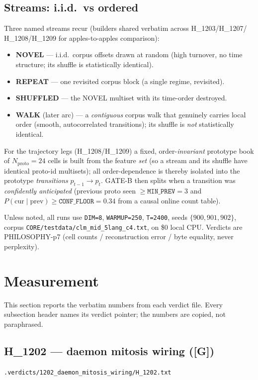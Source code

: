 \documentclass[11pt,a4paper]{article}
\providecommand{\tierGreen}{\textbf{[G]}}
\newcommand{\verdict}[1]{\texttt{\small #1}}
\begin{document}
\subsection{Streams: i.i.d.\ vs ordered}

Three named streams recur (builders shared verbatim across H\_1203/H\_1207/
H\_1208/H\_1209 for apples-to-apples comparison):
\begin{itemize}\itemsep0.2em
\item \textbf{NOVEL} --- i.i.d.\ corpus offsets drawn at random (high turnover,
      no time structure; its shuffle is statistically identical).
\item \textbf{REPEAT} --- one revisited corpus block (a single regime, revisited).
\item \textbf{SHUFFLED} --- the NOVEL multiset with its time-order destroyed.
\item \textbf{WALK} (later arc) --- a \emph{contiguous} corpus walk that
      genuinely carries local order (smooth, autocorrelated transitions); its
      shuffle is \emph{not} statistically identical.
\end{itemize}
For the trajectory legs (H\_1208/H\_1209) a fixed, order-\emph{invariant}
prototype book of $N_{\text{proto}}=24$ cells is built from the feature
\emph{set} (so a stream and its shuffle have identical proto-id multisets); all
order-dependence is thereby isolated into the prototype \emph{transitions}
$p_{t-1}\!\to\!p_t$. GATE-B then splits when a transition was \emph{confidently
anticipated} (previous proto seen $\ge \texttt{MIN\_PREV}=3$ and
$P(\text{cur}\mid\text{prev}) \ge \texttt{CONF\_FLOOR}=0.34$ from a causal online
count table).

Unless noted, all runs use \verb|DIM=8|, \verb|WARMUP=250|, \verb|T=2400|, seeds
$\{900,901,902\}$, corpus \verb|CORE/testdata/clm_mid_5lang_c4.txt|, on \$0 local
CPU. Verdicts are PHILOSOPHY-p7 (cell counts / reconstruction error / byte
equality, never perplexity).

\section{Measurement}
\label{sec:measurement}

This section reports the verbatim numbers from each verdict file. Every
subsection header names its verdict pointer; the numbers are copied, not
paraphrased.

\subsection{H\_1202 --- daemon mitosis wiring (\tierGreen)}
\label{sec:wiring}
\noindent\verdict{.verdicts/1202\_daemon\_mitosis\_wiring/H\_1202.txt}
\end{document}
